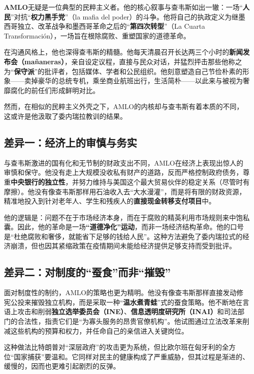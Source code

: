 \textbf{AMLO}无疑是一位典型的民粹主义者。他的核心叙事与查韦斯如出一辙：一场“\textbf{人民}”对抗“\textbf{权力黑手党}”（la mafia del poder）的斗争。他将自己的执政定义为继墨西哥独立、改革战争和墨西哥革命之后的“\textbf{第四次转型}”（La Cuarta Transformación），一场旨在根除腐败、重塑国家的道德革命。

在沟通风格上，他也深得查韦斯的精髓。他每天清晨召开长达两三个小时的\textbf{新闻发布会（mañaneras）}，亲自设定议程，直接与民众对话，并猛烈抨击那些他称之为“\textbf{保守派}”的批评者，包括媒体、学者和公民组织。他刻意塑造自己节俭朴素的形象——卖掉豪华的总统专机，乘坐商业航班出行，生活简朴——以此来与被视为奢靡腐化的前任们形成鲜明对比。

然而，在相似的民粹主义外壳之下，AMLO的内核却与查韦斯有着本质的不同，这或许是他汲取了委内瑞拉教训的结果。

\subsection{差异一：经济上的审慎与务实}

与查韦斯激进的国有化和无节制的财政支出不同，AMLO在经济上表现出惊人的审慎和保守。他没有走上大规模没收私有财产的道路，反而严格控制政府债务，尊重\textbf{中央银行的独立性}，并努力维持与美国这个最大贸易伙伴的稳定关系（尽管时有摩擦）。他没有像查韦斯那样用石油收入去“大水漫灌”，而是将有限的财政资源，精准地投入到针对老年人、学生和残疾人的\textbf{直接现金转移支付项目}中。

他的逻辑是：问题不在于市场经济本身，而在于腐败的精英利用市场规则来中饱私囊。因此，他的革命是一场\textbf{“道德净化”运动}，而非一场经济结构革命。他的口号是“杜绝腐败和奢侈，就能省下足够的钱给人民”。这种方法避免了委内瑞拉式的经济崩溃，但也因其紧缩政策在疫情期间未能给经济提供足够支持而受到批评。

\subsection{差异二：对制度的“蚕食”而非“摧毁”}

面对制度性的制约，AMLO的策略也更为精明。他没有像查韦斯那样直接发动修宪公投来摧毁独立机构，而是采取一种“\textbf{温水煮青蛙}”式的蚕食策略。他不断地在言语上攻击和削弱\textbf{独立选举委员会（INE）}、\textbf{信息透明度研究所（INAI）}和司法部门的合法性，指责它们是“为寡头服务的昂贵官僚机构”。他试图通过立法改革来削减这些机构的预算和权力，并任命自己的亲信进入关键岗位。

这种做法比特朗普对“深层政府”的攻击更为系统，但比欧尔班在匈牙利的全方位“国家捕获”要温和。它同样对民主的健康构成了严重威胁，但其过程是渐进的、缓慢的，因而也更难引起剧烈的反弹。

